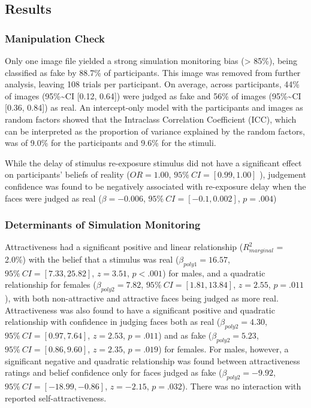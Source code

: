 \documentclass[
  man,mask,floatsintext]{apa6}
\begin{document}
\hypertarget{results}{%
\subsection{Results}\label{results}}

\hypertarget{manipulation-check}{%
\subsubsection{Manipulation Check}\label{manipulation-check}}

Only one image file yielded a strong simulation monitoring bias (\textgreater{} 85\%), being classified as fake by 88.7\% of participants. This image was removed from further analysis, leaving 108 trials per participant. On average, across participants, 44\% of images (95\%\textasciitilde CI {[}0.12, 0.64{]}) were judged as fake and 56\% of images (95\%\textasciitilde CI {[}0.36, 0.84{]}) as real. An intercept-only model with the participants and images as random factors showed that the Intraclass Correlation Coefficient (ICC), which can be interpreted as the proportion of variance explained by the random factors, was of 9.0\% for the participants and 9.6\% for the stimuli.

While the delay of stimulus re-exposure stimulus did not have a significant effect on participants' beliefs of reality (\(OR = 1.00\), \(95\%~CI = [0.99, 1.00]\) ), judgement confidence was found to be negatively associated with re-exposure delay when the faces were judged as real (\(\beta = -0.006\), \(95\%~CI = [-0.1, 0.002]\), \(p = .004\))

\hypertarget{determinants-of-simulation-monitoring}{%
\subsubsection{Determinants of Simulation Monitoring}\label{determinants-of-simulation-monitoring}}

Attractiveness had a significant positive and linear relationship (\(R^2_{marginal}\) = 2.0\%) with the belief that a stimulus was real (\(\beta_{poly1} = 16.57\), \(95\%~CI = [7.33, 25.82]\), \(z = 3.51\), \(p < .001\)) for males, and a quadratic relationship for females (\(\beta_{poly2} = 7.82\), \(95\%~CI = [1.81, 13.84]\), \(z = 2.55\), \(p = .011\)), with both non-attractive and attractive faces being judged as more real. Attractiveness was also found to have a significant positive and quadratic relationship with confidence in judging faces both as real (\(\beta_{poly2} = 4.30\), \(95\%~CI = [0.97, 7.64]\), \(z = 2.53\), \(p = .011\)) and as fake (\(\beta_{poly2} = 5.23\), \(95\%~CI = [0. 86, 9.60]\), \(z = 2.35\), \(p = .019\)) for females. For males, however, a significant negative and quadratic relationship was found between attractiveness ratings and belief confidence only for faces judged as fake (\(\beta_{poly2} = -9.92\), \(95\%~CI = [-18.99, -0.86]\), \(z = -2.15\), \(p = .032\)). There was no interaction with reported self-attractiveness.
\end{document}
